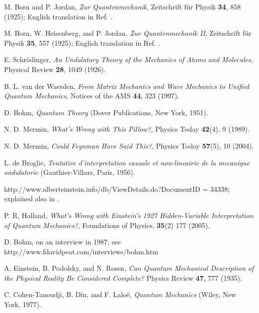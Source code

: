 \documentclass[nofootinbib, secnumarabic, amsmath, nobibnotes,10pt,aps,pra]{revtex4-1}
\begin{document}
\begin{thebibliography}{999}
M. Born and P. Jordan, \emph{Zur Quantenmechanik}, Zeitschrift f\"{u}r Physik \textbf{34},  858 (1925); English translation in Ref. \cite{om.waerden}.

M. Born, W. Heisenberg, and P. Jordan, \emph{Zur Quantenmechanik II}, Zeitschrift f\"{u}r Physik \textbf{35},  557 (1925); English translation in Ref. \cite{om.waerden}.

E. Schr\"odinger, \emph{An Undulatory Theory of the Mechanics of Atoms and Molecules}, Physical Review \textbf{28},  1049 (1926).

B. L. van der Waerden, \emph{From Matrix Mechanics and Wave Mechanics to Unified Quantum Mechanics}, Notices of the AMS \textbf{44},  323 (1997).

D. Bohm, \emph{Quantum Theory} (Dover Publications, New York, 1951).

N. D. Mermin, \emph{What's Wrong with This Pillow?}, Physics Today \textbf{42}(4),  9 (1989).

N. D. Mermin, \emph{Could Feynman Have Said This?}, Physics Today \textbf{57}(5),  10 (2004).

L. de Broglie, \emph{Tentative d'interpretation causale et
non-lineairie de la mecanique ondulatorie} (Gauthier-Villars, Paris,
1956).

http://www.alberteinstein.info/db/ViewDetails.do?DocumentID = 34338; explained also in \cite{om.Hollaneinstein}.

P. R, Holland, \emph{What's Wrong with Einstein's 1927 Hidden-Variable Interpretation of Quantum Mechanics?}, Foundations of Physics,
\textbf{35}(2)  177 (2005).

D. Bohm, on an interview in 1987; see http://www.fdavidpeat.com/interviews/bohm.htm

A. Einstein, B. Podolsky, and N. Rosen, \emph{Can Quantum Mechanical Description of the Physical Reality Be Considered Complete?} Physics Review \textbf{47},  777 (1935).

C. Cohen-Tanoudji, B. Diu, and F. Lalo\"{e}, \emph{Quantum Mechanics} (Wiley, New York, 1977).


\end{thebibliography}
\end{document}
